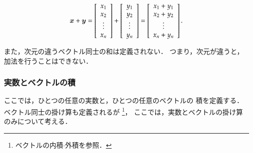                     \begin{align}
                        \boldsymbol{x} + \boldsymbol{y}
                        =
                        \left[
                            \begin{array}{c}
                                x_{1} \\
                                x_{2} \\
                                \vdots \\
                                x_{n} \\
                            \end{array}
                        \right]
                        +
                        \left[
                            \begin{array}{c}
                                y_{1} \\
                                y_{2} \\
                                \vdots \\
                                y_{n} \\
                            \end{array}
                        \right]
                        =
                        \left[
                            \begin{array}{c}
                                x_{1} + y_{1} \\
                                x_{2} + y_{2} \\
                                \vdots \\
                                x_{n} + y_{n} \\
                            \end{array}
                        \right].
                    \end{align}

                    また，次元の違うベクトル同士の和は定義されない．
                    つまり，次元が違うと，加法を行うことはできない．

            \subsubsection{実数とベクトルの積}
                ここでは，ひとつの任意の実数と，ひとつの任意のベクトルの
                積を定義する．ベクトル同士の掛け算も定義されるが
                    \footnote{
                        ベクトルの内積$\cdot$外積を参照．
                    }，
                ここでは，実数とベクトルの掛け算のみについて考える．


